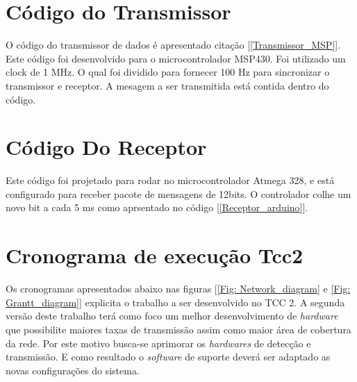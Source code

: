\begin{apendicesenv}

\partapendices

\chapter{Código do Transmissor}


O código do transmissor de dados é apresentado citação [\ref{Transmissor_MSP}]. Este código foi desenvolvido para o microcontrolador MSP430. Foi utilizado um clock de 1 MHz. O qual foi dividido para fornecer 100 Hz para sincronizar o transmissor e receptor.
A mesagem a ser transmitida está contida dentro do código.







\chapter{Código Do Receptor}

Este código foi projetado para rodar no microcontrolador Atmega 328, e está configurado para receber pacote de mensagens de 12bits. O controlador colhe um novo bit a cada 5 ms como aprsentado no código [\ref{Receptor_arduino}]. 





\chapter{Cronograma de execução Tcc2}

Os cronogramas apresentados abaixo nas figuras [\ref{Fig: Network_diagram} e \ref{Fig: Grantt_diagram}] explicita o trabalho a ser desenvolvido no TCC 2. A segunda versão deste trabalho terá como foco um melhor desenvolvimento de \textit{hardware} que possibilite maiores taxas de transmissão assim como maior área de cobertura da rede. Por este motivo busca-se aprimorar os \textit{hardwares} de detecção e transmissão. E como resultado o \textit{software} de suporte deverá ser adaptado as novas configurações do sistema.


\end{apendicesenv}
